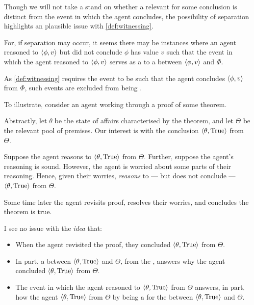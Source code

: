 \begin{note}
  Though we will not take a stand on whether a relevant  for some conclusion is distinct from the event in which the agent concludes, the possibility of separation highlights an plausible issue with \autoref{def:witnessing}.

  For, if separation may occur, it seems there may be instances where an agent reasoned to \(\langle \phi, v \rangle\) but did not conclude \(\phi\) has value \(v\) such that the event in which the agent reasoned to \(\langle \phi, v \rangle\) serves as a  to a \ros{} between \(\langle \phi, v \rangle\) and \(\Phi\).

  As \autoref{def:witnessing} requires the event to be such that the agent concludes \(\langle \phi, v \rangle\) from \(\Phi\), such events are excluded from being .

  To illustrate, consider an agent working through a proof of some theorem.

  Abstractly, let \(\theta\) be the state of affairs characterised by the theorem, and let \(\Theta\) be the relevant pool of premises.
  Our interest is with the conclusion \(\langle \theta, \text{True} \rangle\) from \(\Theta\).

  Suppose the agent reasons to \(\langle \theta, \text{True} \rangle\) from \(\Theta\).
  Further, suppose the agent's reasoning is sound.
  However, the agent is worried about some parts of their reasoning.
  Hence, given their worries, \emph{reasons} to --- but does not conclude --- \(\langle \theta, \text{True} \rangle\) from \(\Theta\).

  Some time later the agent revisits proof, resolves their worries, and concludes the theorem is true.

  I see no issue with the \emph{idea} that:
  \begin{itemize}[noitemsep]
  \item
    When the agent revisited the proof, they concluded \(\langle \theta, \text{True} \rangle\) from \(\Theta\).
  \item
    In part, a \ros{} between \(\langle \theta, \text{True} \rangle\) and \(\Theta\), from the \agpe{}, answers why the agent concluded \(\langle \theta, \text{True} \rangle\) from \(\Theta\).
  \item
    The event in which the agent reasoned to \(\langle \theta, \text{True} \rangle\) from \(\Theta\) answers, in part, how the agent \(\langle \theta, \text{True} \rangle\) from \(\Theta\) by being a \wit{} for the \ros{} between \(\langle \theta, \text{True} \rangle\) and \(\Theta\).
  \end{itemize}


\end{note}
